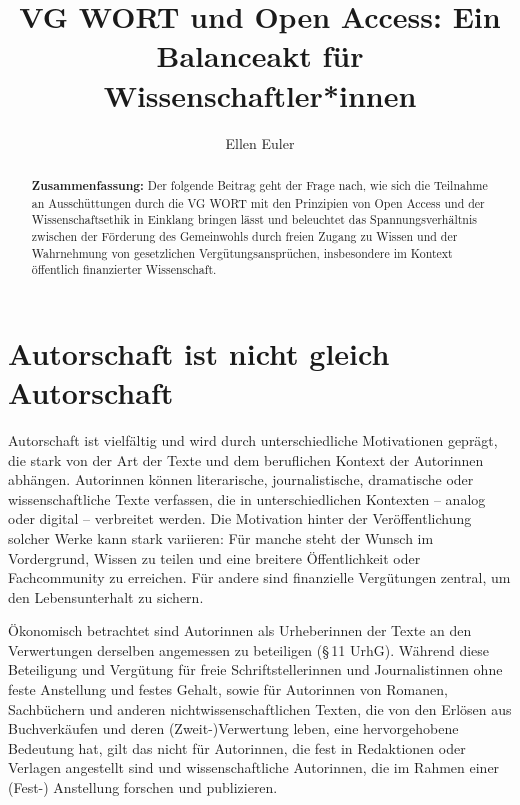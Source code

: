 \documentclass[a4paper,
fontsize=11pt,
oneside,
numbers=noperiodatend,
parskip=half-,
bibliography=totoc,
final
]{scrartcl}
\title{\LARGE{VG WORT und Open Access: Ein Balanceakt für Wissenschaftler*innen}}%
\author{Ellen Euler} %
\date{}
\begin{document}
\maketitle
\thispagestyle{fancyplain} 

\begin{abstract}
\noindent
\textbf{Zusammenfassung:} Der folgende Beitrag geht der Frage nach, wie
sich die Teilnahme an Ausschüttungen durch die VG WORT mit den
Prinzipien von Open Access und der Wissenschaftsethik in Einklang
bringen lässt und beleuchtet das Spannungsverhältnis zwischen der
Förderung des Gemeinwohls durch freien Zugang zu Wissen und der
Wahrnehmung von gesetzlichen Vergütungsansprüchen, insbesondere im
Kontext öffentlich finanzierter Wissenschaft.
\end{abstract}

\section{Autorschaft ist nicht gleich
Autorschaft}\label{autorschaft-ist-nicht-gleich-autorschaft}

Autorschaft ist vielfältig und wird durch unterschiedliche Motivationen
geprägt, die stark von der Art der Texte und dem beruflichen Kontext der
Autorinnen abhängen. Autorinnen können literarische, journalistische,
dramatische oder wissenschaftliche Texte verfassen, die in
unterschiedlichen Kontexten -- analog oder digital -- verbreitet werden.
Die Motivation hinter der Veröffentlichung solcher Werke kann stark
variieren: Für manche steht der Wunsch im Vordergrund, Wissen zu teilen
und eine breitere Öffentlichkeit oder Fachcommunity zu erreichen. Für
andere sind finanzielle Vergütungen zentral, um den Lebensunterhalt zu
sichern.

Ökonomisch betrachtet sind Autorinnen als Urheberinnen der Texte an den
Verwertungen derselben angemessen zu beteiligen (§\,11 UrhG). Während
diese Beteiligung und Vergütung für freie Schriftstellerinnen und
Journalistinnen ohne feste Anstellung und festes Gehalt, sowie für
Autorinnen von Romanen, Sachbüchern und anderen nichtwissenschaftlichen
Texten, die von den Erlösen aus Buchverkäufen und deren
(Zweit-)Verwertung leben, eine hervorgehobene Bedeutung hat, gilt das
nicht für Autorinnen, die fest in Redaktionen oder Verlagen angestellt
sind und wissenschaftliche Autorinnen, die im Rahmen einer (Fest-)
Anstellung forschen und publizieren.
\end{document}
